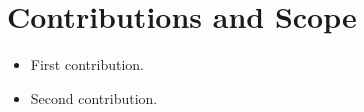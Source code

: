 \section{Contributions and Scope}
\label{sec:intro-contributions}


\begin{itemize}
  \item First contribution.
  \item Second contribution.
\end{itemize}
